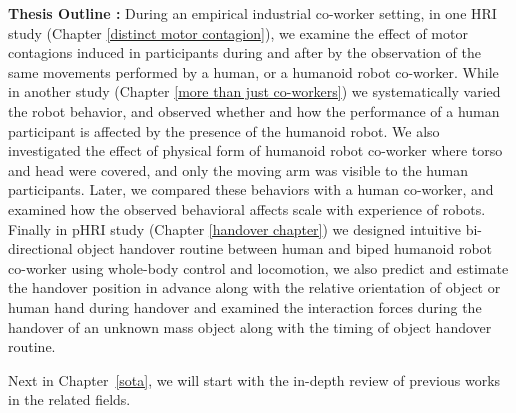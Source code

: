 \textbf{Thesis Outline :} During an empirical industrial co-worker setting, in one HRI study (Chapter \ref{distinct motor contagion}), we examine the effect of motor contagions induced in participants during and after by the observation of the same movements performed by a human, or a humanoid robot co-worker. While in  another study (Chapter \ref{more than just co-workers}) we systematically varied the robot behavior, and observed whether and how the performance of a human participant is affected by the presence of the humanoid robot. We also investigated the effect of physical form of humanoid robot co-worker where torso and head were covered, and only the moving arm was visible to the human participants. Later, we compared these behaviors with a human co-worker, and examined how the observed behavioral affects scale with experience of robots. Finally in pHRI study (Chapter \ref{handover chapter}) we designed intuitive bi-directional object handover routine between human and biped humanoid robot co-worker using whole-body control and locomotion, we also predict and estimate the handover position in advance along with the relative orientation of object or human hand during handover and examined the interaction forces during the handover of an unknown mass object along with the timing of object handover routine.

Next in Chapter~\ref{sota}, we will start with the in-depth review of previous works in the related fields.



\clearpage %
\pagestyle{fancy}